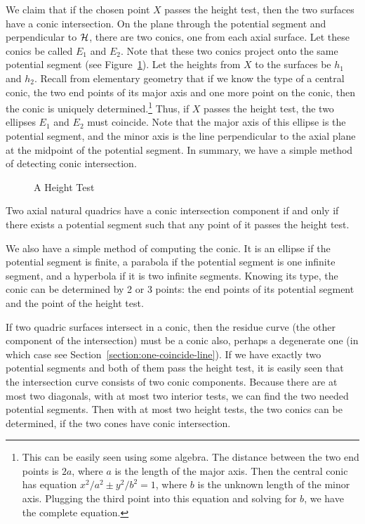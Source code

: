      We claim that if the chosen point $X$ passes the height test, then the two
surfaces have a conic intersection.   On the plane through the potential 
segment and perpendicular to ${\cal H}$, there are two conics, one from each 
axial surface.  Let these conics be called $E_1$ and $E_2$.  Note that these 
two conics project onto the same potential segment (see 
Figure~\ref{fig:height-test}).  Let the heights from $X$ to the surfaces be 
$h_1$ and $h_2$.  Recall from elementary geometry that if we know the type of a
central conic, the two end points of its major axis and one more point on the 
conic, then the conic is uniquely determined.\footnote{This can be easily seen
using some algebra.  The distance between the two end points is $2a$, where $a$
is the length of the major axis.  Then the central conic has equation 
$x^2/a^2\pm y^2/b^2=1$, where $b$ is the unknown length of the minor axis.  
Plugging the third point into this equation and solving for $b$, we have the 
complete equation.}  Thus, if $X$ passes the height test, the two ellipses 
$E_1$ and $E_2$ must coincide.  Note that the major axis of this ellipse is
the potential segment, and the minor axis is the line perpendicular to the 
axial plane at the midpoint of the potential segment.  
In summary, we have a simple method of detecting conic intersection.
\begin{figure}[h]
\vspace{5.5cm}
\caption{A Height Test}
\label{fig:height-test}
\end{figure}

\begin{theorem}
\label{theorem:conic-conditions-using-height-test}
     Two axial natural quadrics have a conic 
intersection component if and only if there exists a potential segment such 
that any point of it passes the height test.
\end{theorem}

     We also have a simple method of computing the conic.  It is an ellipse
if the potential segment is finite, a parabola if the potential segment is
one infinite segment, and a hyperbola if it is two infinite segments.
Knowing its type, the conic can be determined by 2 or 3 points: the end points
of its potential segment and the point of the height test.

     If two quadric surfaces intersect in a conic, then the residue curve (the
other component of the intersection) must be a conic also, perhaps a 
degenerate one (in which case see Section~\ref{section:one-coincide-line}).  
If we have exactly two potential segments and both of them 
pass the height test, it is easily seen that the intersection curve consists 
of two conic components.  Because there are at most two diagonals,
with at most two interior tests,
we can find the two needed potential segments.  Then with at most
two height tests, the two conics can be determined, if the two cones
have conic intersection.

